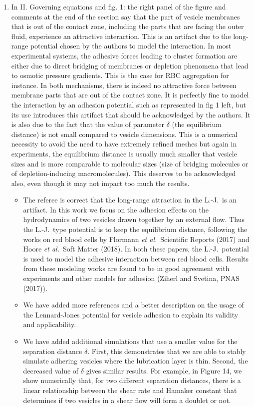 \documentclass[11pt]{article}
\newcommand{\comment}[1]{{\color{blue} #1}}
\begin{document}
\begin{enumerate}
\item\comment{In II. Governing equations and fig. 1: the right panel of the
figure and comments at the end of the section say that the part of
vesicle membranes that is out of the contact zone, including the parts
that are facing the outer fluid, experience an attractive interaction.
This is an artifact due to the long-range potential chosen by the
authors to model the interaction. In most experimental systems, the
adhesive forces leading to cluster formation are either due to direct
bridging of membranes or depletion phenomena that lead to osmotic
pressure gradients. This is the case for RBC aggregation for instance.
In both mechanisms, there is indeed no attractive force between membrane
parts that are out of the contact zone. It is perfectly fine to model
the interaction by an adhesion potential such as represented in fig 1
left, but its use introduces this artifact that should be acknowledged
by the authors. It is also due to the fact that the value of parameter
$\delta$ (the equilibrium distance) is not small compared to vesicle
dimensions. This is a numerical necessity to avoid the need to have
extremely refined meshes but again in experiments, the equilibrium
distance is usually much smaller that vesicle sizes and is more
comparable to molecular sizes (size of bridging molecules or of
depletion-inducing macromolecules). This deserves to be acknowledged
also, even though it may not impact too much the results.}
\begin{itemize}
  \item The referee is correct that the long-range attraction in the
    L.-J.~is an artifact.  In this work we focus on the adhesion effects
    on the hydrodynamics of two vesicles drawn together by an external
    flow.  Thus the L.-J.~type potential is to keep the equilibrium
    distance, following the works on red blood cells by Flormann {\em et
    al.}~Scientific Reports (2017) and Hoore {\em et al.}~Soft Matter
    (2018).  In both these papers, the L.-J.~potential is used to model
    the adhesive interaction between red blood cells.  Results from
    these modeling works are found to be in good agreement with
    experiments and other models for adhesion (Ziherl and Svetina, PNAS
    (2017)).
    
  \item We have added more references and a better description on the
    usage of the Lennard-Jones potential for vesicle adhesion to explain
    its validity and applicability.

  \item We have added additional simulations that use a smaller value
    for the separation distance $\delta$.  First, this demonstrates that
    we are able to stably simulate adhering vesicles where the
    lubrication layer is thin.  Second, the decreased value of $\delta$
    gives similar results.  For example, in Figure 14, we show
    numerically that, for two different separation distances, there is a
    linear relationship between the shear rate and Hamaker constant that
    determines if two vesicles in a shear flow will form a doublet or
    not.
\end{itemize}


\end{enumerate}
\end{document}
